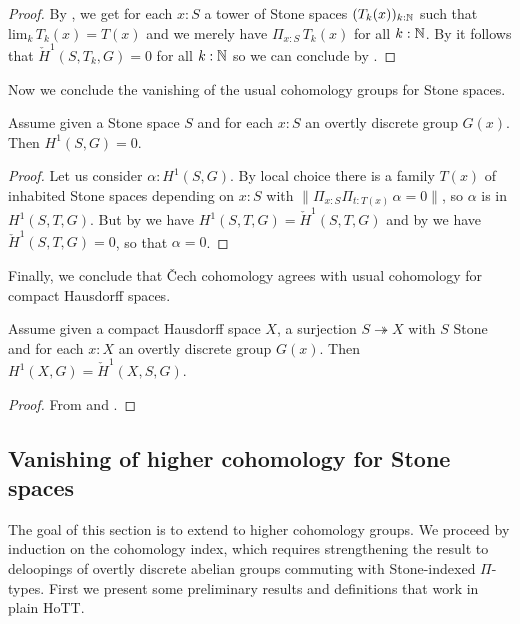 \begin{proof}
  By , we get for each $x:S$ a tower of Stone spaces $(T_k(x))_{k:\mathbb{N}}$ such that $\mathrm{lim}_k\,T_k(x) = T(x)$ and we merely have $\Pi_{x:S}\,T_k(x)$ for all $k:\mathbb{N}$. By  it follows that $\check{H}^1(S,T_k,G) = 0$ for all $k:\mathbb{N}$ so we can conclude by .
\end{proof}

Now we conclude the vanishing of the usual cohomology groups for Stone spaces. 

\begin{proposition}\label{vanishing-first-stone}
Assume given a Stone space $S$ and for each $x:S$ an overtly discrete group $G(x)$. Then $H^1(S,G) = 0$.
\end{proposition}

\begin{proof}
  Let us consider $\alpha:H^1(S,G)$. By local choice there is a family $T(x)$ of inhabited Stone spaces depending on $x:S$ with $\|\Pi_{x:S}\Pi_{t:T(x)}\, \alpha = 0 \|$, so $\alpha$ is in $H^1(S,T,G)$. But by  we have $H^1(S,T,G) = \check{H}^1(S,T,G)$ and by  we have $\check{H}^1(S,T,G) = 0$, so that $\alpha=0$.
\end{proof}

Finally, we conclude that \v{C}ech cohomology agrees with usual cohomology for compact Hausdorff spaces.

\begin{proposition}\label{non-abelian-cech-and-sheaf-agree}
Assume given a compact Hausdorff space $X$, a surjection $S\twoheadrightarrow X$ with $S$ Stone and for each $x:X$ an overtly discrete group $G(x)$. Then $H^1(X,G) = \check{H}^1(X,S,G)$.
\end{proposition}

\begin{proof}
From  and .
\end{proof}



\subsection{Vanishing of higher cohomology for Stone spaces}
\label{vanishing-stone}

The goal of this section is to extend  to higher cohomology groups. We proceed by induction on the cohomology index, which requires strengthening the result to deloopings of overtly discrete abelian groups commuting with Stone-indexed $\Pi$-types. First we present some preliminary results and definitions that work in plain HoTT.

